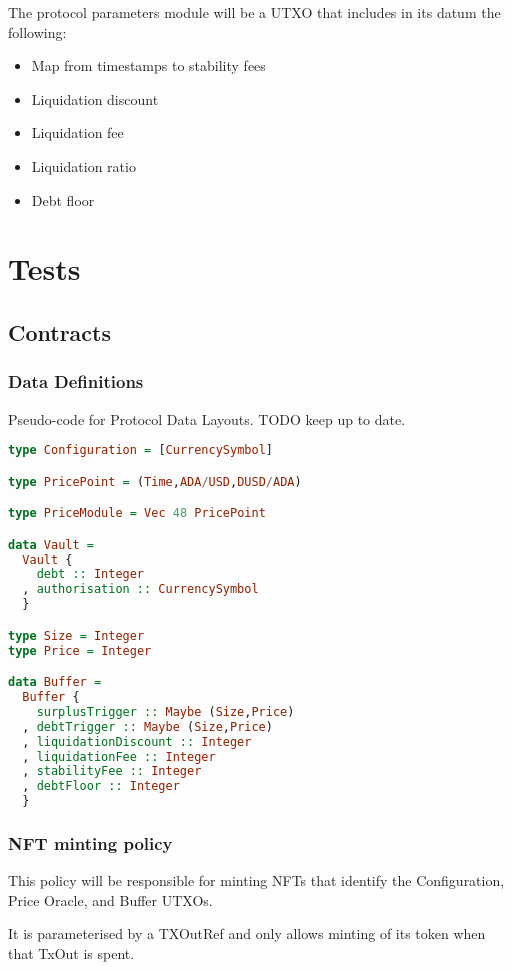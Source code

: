 \documentclass{article} %
\begin{document}
The protocol parameters module will be a UTXO that includes in its datum the following:
\begin{itemize}
  \item Map from timestamps to stability fees
  \item Liquidation discount
  \item Liquidation fee
  \item Liquidation ratio
  \item Debt floor
\end{itemize}

\section{Tests}

\subsection{Contracts}

\subsubsection{Data Definitions}
Pseudo-code for Protocol Data Layouts. TODO keep up to date.

\begin{lstlisting}[language=Haskell]
type Configuration = [CurrencySymbol]

type PricePoint = (Time,ADA/USD,DUSD/ADA)

type PriceModule = Vec 48 PricePoint

data Vault =
  Vault {
    debt :: Integer
  , authorisation :: CurrencySymbol
  }

type Size = Integer
type Price = Integer

data Buffer =
  Buffer {
    surplusTrigger :: Maybe (Size,Price)
  , debtTrigger :: Maybe (Size,Price)
  , liquidationDiscount :: Integer
  , liquidationFee :: Integer
  , stabilityFee :: Integer
  , debtFloor :: Integer
  }
\end{lstlisting}

\subsubsection{NFT minting policy}
This policy will be responsible for minting NFTs that identify the Configuration, Price Oracle, and Buffer UTXOs.

It is parameterised by a TXOutRef and only allows minting of its token when that TxOut is spent.
\end{document}

